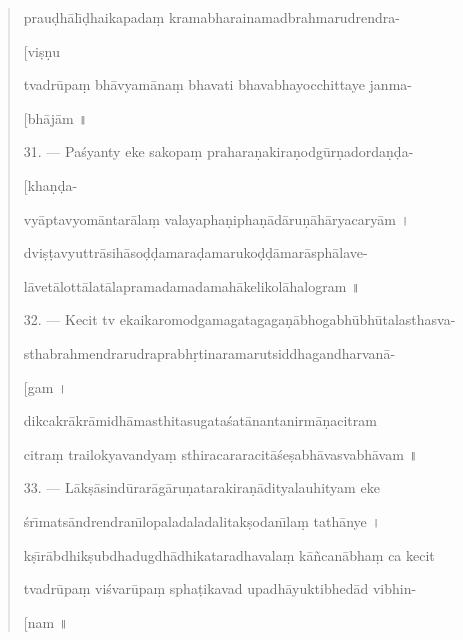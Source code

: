\documentclass[a4paper, 11pt, oneside, french]{article}
\begin{document}
\begin{quotation}
prau\d{d}h\={a}l\={\i}\d{d}haikapada\d{m} kramabharainamadbrahmarudrendra-

\hspace*{25mm}[vi\d{s}\d{n}u

tvadr\={u}pa\d{m} bh\={a}vyam\={a}na\d{m} bhavati bhavabhayocchittaye janma-

\hspace*{25mm}[bh\={a}j\={a}m \texthindi{॥}

\bigskip

31. --- Pa\'{s}yanty eke sakopa\d{m} prahara\d{n}akira\d{n}odg\={u}r\d{n}adorda\d{n}\d{d}a-

\hspace*{25mm}[kha\d{n}\d{d}a-

vy\={a}ptavyom\={a}ntar\={a}la\d{m} valayapha\d{n}ipha\d{n}\={a}d\={a}ru\d{n}\={a}h\={a}ryacary\={a}m \texthindi{।}

dvi\d{s}\d{t}avyuttr\={a}sih\={a}so\d{d}\d{d}amara\d{d}amaruko\d{d}\d{d}\={a}mar\={a}sph\={a}lave-

l\={a}vet\={a}lott\={a}lat\={a}lapramadamadamah\={a}kelikol\={a}halogram \texthindi{॥}

\bigskip

32. --- Kecit tv ekaikaromodgamagatagaga\d{n}\={a}bhogabh\={u}bh\={u}talasthasva-

sthabrahmendrarudraprabh\d{r}tinaramarutsiddhagandharvan\={a}-

\hspace*{25mm}[gam \texthindi{।}

dikcakr\={a}kr\={a}midh\={a}masthitasugata\'{s}at\={a}nantanirm\={a}\d{n}acitram

citra\d{m} trailokyavandya\d{m} sthiracararacit\={a}\'{s}e\d{s}abh\={a}vasvabh\={a}vam \texthindi{॥}

\bigskip

33. --- L\={a}k\d{s}\={a}sind\={u}rar\={a}g\={a}ru\d{n}atarakira\d{n}\={a}dityalauhityam eke

\'{s}r\={\i}mats\={a}ndrendran\={\i}lopaladaladalitak\d{s}odan\={\i}la\d{m} tath\={a}nye \texthindi{।}

k\d{s}\={\i}r\={a}bdhik\d{s}ubdhadugdh\={a}dhikataradhavala\d{m} k\={a}\~{n}can\={a}bha\d{m} ca kecit

tvadr\={u}pa\d{m} vi\'{s}var\={u}pa\d{m} spha\d{t}ikavad upadh\={a}yuktibhed\={a}d vibhin-

\hspace*{25mm}[nam \texthindi{॥}

\bigskip


\end{quotation}
\end{document}
